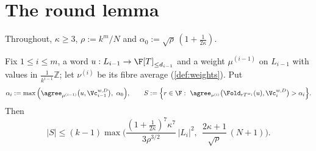\section{The round lemma}

Throughout, $\kappa\ge3$, $\rho:=k^m/N$ and $\alpha_0:=\sqrt\rho\,(1+\frac1{2\kappa})$.

\setcounter{lemma}{7}\begin{lemma}\label{lem:round}
Fix $1\le i\le m$, a word $u:L_{i-1}\to\F[T]_{\le d_{i-1}}$ and a weight
$\mu^{(i-1)}$ on $L_{i-1}$ with values in $\frac1{k^{i-1}}\mathbb Z$; let $\nu^{(i)}$ be its
fibre average (\cref{def:weights}). Put
\[
\alpha_i:=\max\Big(\agree_{\mu^{(i-1)}}\big(u,\Vc_{i-1}^{w,D}\big),\ \alpha_0\Big),\qquad
S:=\Big\{r\in\F:\ \agree_{\nu^{(i)}}\big(\Fold_{rT^{w_i}}(u),\Vc_i^{w,D}\big)>\alpha_i\Big\}.
\]
Then
\[
|S|\le(k-1)\max\Big(\frac{(1+\frac1{2\kappa})^7\kappa^7}{3\rho^{3/2}}\,|L_i|^2,\ \
\frac{2\kappa+1}{\sqrt\rho}\,(N+1)\Big).
\]
\end{lemma}

